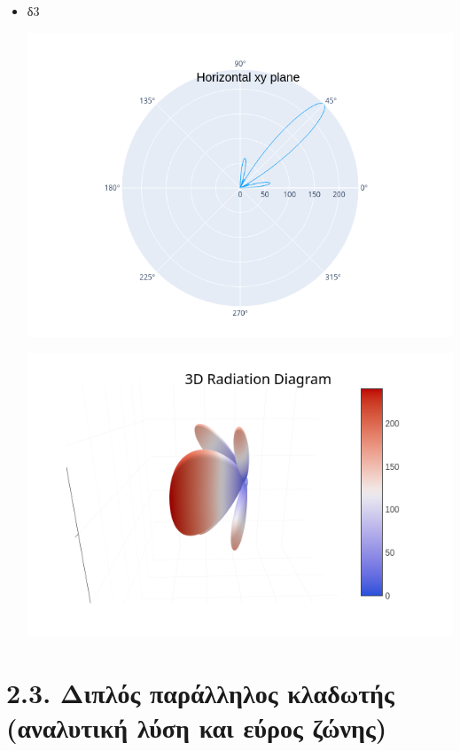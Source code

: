 \documentclass[12pt]{article}
\begin{document}
\begin{itemize}
    \item δ3
    \begin{center}
        \includegraphics*[scale=0.6]{d3_xy.png}
    \end{center}
    \begin{center}
        \includegraphics*[scale=0.6]{d3_3d.png}
    \end{center}
\end{itemize}

\newpage
\section*{2.3. Διπλός παράλληλος κλαδωτής (αναλυτική λύση και εύρος ζώνης)}
\end{document}
